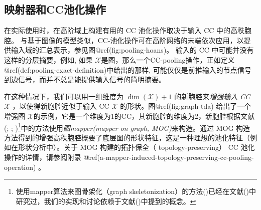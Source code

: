 \documentclass[
  12pt,
]{krantz}
\begin{document}
\subsection{映射器和CC池化操作}\label{mapper-and-the-cc-pooling-operation}

在实际使用时，在高阶域上构建有用的 CC 池化操作取决于输入 CC
中的高秩胞腔。
与基于图像的模型类似，CC-池化操作可在高阶网络的末端依次应用，以提供输入域的汇总表示，参见图@ref(fig:pooling-hoans)。
输入的 CC 中可能并没有这样的分层摘要，例如, 如果
\(\mathcal{X}\)是图，那么一个CC-pooling操作，正如定义@ref(def:pooling-exact-definition)中给出的那样,
可能仅仅是前推输入的节点信号到边信号，而并不总是能提供输入信号的简明摘要。

在这种情况下，我们可以用一组维度为 \(\dim(\mathcal{X})+1\)
的新胞腔来\emph{增强输入 CC} \(\mathcal{X}\) ，以使得新胞腔近似于输入 CC
\(\mathcal{X}\) 的形状。图@ref(fig:graph-tda) 给出了一个增强图
\(\mathcal{X}\)的示例，它是一个维度为1的CC，其新胞腔的维度为2，新胞腔根据文献(; ; )\footnote{使用mapper算法来图骨架化（graph
  skeletonization）的方法()已经在文献()中研究过，我们的实现和讨论依赖于文献()中提到的概念。}中的方法使用\emph{图mapper(mapper
on graph, MOG)}来构造。通过 MOG
构造方法得到的增强高秩胞腔概要了底层图的形状特征，这是一种理想的池化特征（例如在形状分析中）。关于
MOG 构建的拓扑保全（ topology-preserving） CC 池化操作的详情，请参阅附录
@ref(a-mapper-induced-topology-preserving-cc-pooling-operation) 。
\end{document}
